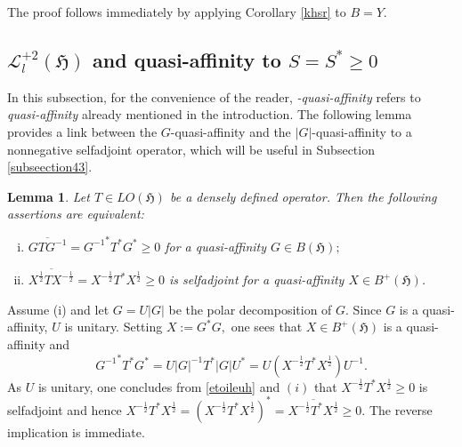 \documentclass{amsart}
\makeatletter
\newtheorem{lemma}[theorem]{Lemma}
\newcommand{\h}{\mathfrak{H}}
\newcommand{\bh}{B(\h)}
\newcommand{\adj}{^*}
\newcommand{\inv}{^{-1}}
\newcommand{\tstar}{T^{*}}
\newcommand{\half}{^{\frac{1}{2}}}
\newcommand{\mhalf}{^{-\frac{1}{2}}}
\newcommand{\lplus}{B^{+}(\h)}
\newcommand{\ldeux}{\mathcal{L}_l^{+2}(\h)}
\numberwithin{equation}{section}
\renewenvironment{proof}[1][\proofname]{%
   \par\pushQED{\qed}\normalfont%
   \topsep6\p@\@plus6\p@\relax
   \trivlist\item[\hskip\labelsep\bfseries#1\@addpunct{.}]%
   \ignorespaces
}{%
   \popQED\endtrivlist\@endpefalse
}
\renewcommand{\labelenumi}{(\arabic{enumi})}
\makeatother
\begin{document}
\begin{proof}
The proof follows immediately by applying Corollary \ref{khsr} to $B=Y.$
\end{proof}


          \subsection{$\ldeux$ and quasi-affinity   to $S= S\adj \geq 0$ }\label{subsection1}

 In this subsection, for the convenience of the reader,  \emph{-quasi-affinity} refers to \emph{quasi-affinity}  already mentioned in the introduction.
 The following lemma provides a  link between the $G$-quasi-affinity and the $|G|$-quasi-affinity to a nonnegative selfadjoint operator, which will be useful in Subsection \ref{subseection43}.

\begin{lemma}\label{remquasiaffini}
Let $T \in LO(\h)$ be a densely defined operator. Then  the following assertions are equivalent:
\begin{enumerate}[(i)]\def\labelenumi{\rm(\roman{enumi})}
  \item  $\overline{GT G\inv}= {G\inv}\adj \tstar G\adj \geq 0$ for a quasi-affinity $G \in \bh;$
  \item $ \overline{ X\half T X\mhalf} = X\mhalf \tstar X\half \geq 0$ is selfadjoint for a quasi-affinity    $X  \in \lplus$.
\end{enumerate}
\end{lemma}

%
\begin{proof}
  Assume \rm{(i)} and   let $G= U |G|$ be the polar decomposition of $G.$ Since $G$ is a quasi-affinity, $U$ is unitary. Setting  $X:=G\adj G,$ one   sees that $X \in \lplus$ is a quasi-affinity and
  \begin{equation}\label{etoileuh}
    {G\inv}\adj \tstar G\adj  = U |G|\inv \tstar |G| U\adj = U (    X\mhalf \tstar X\half ) U\inv.
  \end{equation}
 As $U$ is unitary, one concludes from \eqref{etoileuh} and  $(i)$ that  $X\mhalf \tstar X\half \geq 0$ is   selfadjoint and hence $X\mhalf \tstar X\half = (X\mhalf \tstar X\half)\adj= \overline{X\mhalf \tstar X\half} \geq 0$. The reverse implication is immediate.
\end{proof}
\end{document}
